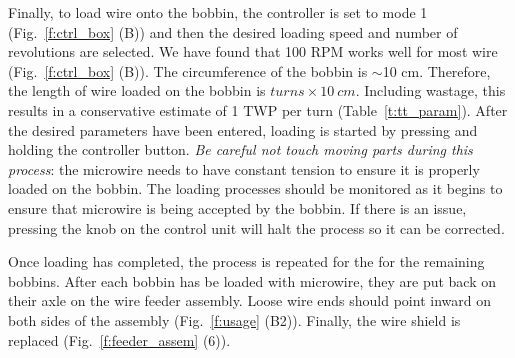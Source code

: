 \documentclass[11pt,a4paper]{article}
\begin{document}
Finally, to load wire onto the bobbin, the controller is set to mode 1
(Fig.~\ref{f:ctrl_box} (B)) and then the desired loading speed and number of
revolutions are selected. We have found that 100 RPM works well for most wire
(Fig.~\ref{f:ctrl_box} (B)). The circumference of the bobbin is $\sim$10 cm.
Therefore, the length of wire loaded on the bobbin is $turns \times 10\ cm$.
Including wastage, this results in a conservative estimate of 1 TWP per turn
(Table~\ref{t:tt_param}). After the desired parameters have been entered,
loading is started by pressing and holding the controller button. \textit{Be
careful not touch moving parts during this process}: the microwire needs to
have constant tension to ensure it is properly loaded on the bobbin. The
loading processes should be monitored as it begins to ensure that microwire is
being accepted by the bobbin. If there is an issue, pressing the knob on the
control unit will halt the process so it can be corrected.

Once loading has completed, the process is repeated for the for the remaining
bobbins.  After each bobbin has be loaded with microwire, they are put back on
their axle on the wire feeder assembly. Loose wire ends should point inward on
both sides of the assembly (Fig.~\ref{f:usage} (B2)). Finally, the wire shield
is replaced (Fig.~\ref{f:feeder_assem} (6)).
\end{document}
